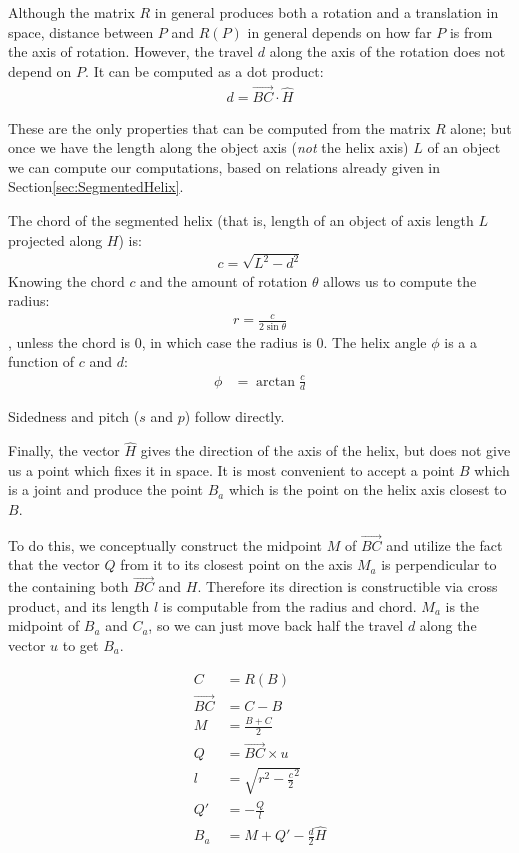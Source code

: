 \documentclass[11pt]{article}
\begin{document}
{Although the matrix $R$ in general produces both a rotation
and a translation in space, distance between $P$ and $R(P)$
in general depends on how far $P$ is from the axis of rotation.
However, the travel $d$ along the axis of the rotation does
not depend on $P$. It can be computed as a dot product:
\begin{align}
  d = \overrightarrow{BC} \cdot \hat{H}
\end{align}

These are the only properties that can be computed from the
matrix $R$ alone; but once we have the length along the
object axis ({\em not} the helix axis) $L$ of an object
we can compute our computations, based on relations
already given in Section\ref{sec:SegmentedHelix}.

The chord of the segmented helix (that is, length of an object of
axis length $L$
projected along $H$) is:
\begin{align}
  c = \sqrt{L^2 - d^2}
\end{align}
Knowing the chord $c$ and the amount of rotation $\theta$
allows us to compute the radius:
\begin{align}
  r = \frac{c}{2 \sin{\theta}}
\end{align},
unless the chord is $0$, in which case the radius is $0$.
The helix angle $\phi$ is a a function of $c$ and $d$:
\begin{align}
    \phi &= \arctan{\frac{c}{d}}
\end{align}

Sidedness and pitch ($s$ and $p$) follow directly.

Finally, the vector $\hat{H}$ gives the direction of the
axis of the helix, but does not give us a point which fixes
it in space. It is most convenient to accept a point $B$
which is a joint and produce the point $B_a$ which is the
point on the helix axis closest to $B$.

To do this, we conceptually construct the midpoint $M$
of $\overrightarrow{BC}$ and utilize the fact that the vector $Q$
from it to its closest point on the axis $M_a$ is perpendicular
to the containing both $\overrightarrow{BC}$ and $H$. Therefore
its direction is constructible via cross product, and
its length $l$ is computable from the radius and chord. $M_a$
is the midpoint of $B_a$ and $C_a$, so we can just move back
half the travel $d$ along the vector $u$ to get $B_a$.

\begin{align}
  C &= R(B) \\
  \overrightarrow{BC} &= C - B\\
  M &= \frac{B + C}{2} \\
  Q &= \overrightarrow{BC} \times u \\
  l &= \sqrt{r^2 - \frac{c}{2}^2} \\
  Q' &= -\frac{Q}{l} \\
  B_a &= M + Q' - \frac{d}{2}\hat{H}
\end{align}

}
\end{document}
